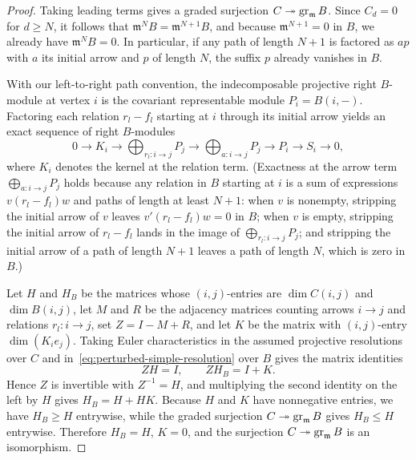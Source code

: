 \begin{proof}
Taking leading terms gives a graded surjection $C\twoheadrightarrow\operatorname{gr}_{\mathfrak m}B$. Since $C_d=0$ for $d\geq N$, it follows that $\mathfrak m^NB=\mathfrak m^{N+1}B$, and because $\mathfrak m^{N+1}=0$ in $B$, we already have $\mathfrak m^NB=0$. In particular, if any path of length $N+1$ is factored as $ap$ with $a$ its initial arrow and $p$ of length $N$, the suffix $p$ already vanishes in $B$.

With our left-to-right path convention, the indecomposable projective right $B$-module at vertex $i$ is the covariant representable module $P_i=B(i,-)$. Factoring each relation $r_l-f_l$ starting at $i$ through its initial arrow yields an exact sequence of right $B$-modules
\begin{equation}
  0\longrightarrow K_i\longrightarrow
  \bigoplus_{r_l:i\to j}P_j\longrightarrow
  \bigoplus_{a:i\to j}P_j\longrightarrow P_i\longrightarrow S_i
  \longrightarrow0,
  \label{eq:perturbed-simple-resolution}
\end{equation}
where $K_i$ denotes the kernel at the relation term. (Exactness at the arrow term $\bigoplus_{a:i\to j}P_j$ holds because any relation in $B$ starting at $i$ is a sum of expressions $v(r_l-f_l)w$ and paths of length at least $N+1$: when $v$ is nonempty, stripping the initial arrow of $v$ leaves $v'(r_l-f_l)w=0$ in $B$; when $v$ is empty, stripping the initial arrow of $r_l-f_l$ lands in the image of $\bigoplus_{r_l:i\to j}P_j$; and stripping the initial arrow of a path of length $N+1$ leaves a path of length $N$, which is zero in $B$.)

Let $H$ and $H_B$ be the matrices whose $(i,j)$-entries are $\dim C(i,j)$ and $\dim B(i,j)$, let $M$ and $R$ be the adjacency matrices counting arrows $i\to j$ and relations $r_l\colon i\to j$, set $Z=I-M+R$, and let $K$ be the matrix with $(i,j)$-entry $\dim(K_i e_j)$. Taking Euler characteristics in the assumed projective resolutions over $C$ and in~\eqref{eq:perturbed-simple-resolution} over $B$ gives the matrix identities
\[
  ZH=I,\qquad ZH_B=I+K.
\]
Hence $Z$ is invertible with $Z^{-1}=H$, and multiplying the second identity on the left by $H$ gives $H_B=H+HK$. Because $H$ and $K$ have nonnegative entries, we have $H_B\geq H$ entrywise, while the graded surjection $C\twoheadrightarrow\operatorname{gr}_{\mathfrak m}B$ gives $H_B\leq H$ entrywise. Therefore $H_B=H$, $K=0$, and the surjection $C\twoheadrightarrow\operatorname{gr}_{\mathfrak m}B$ is an isomorphism.
\end{proof}


